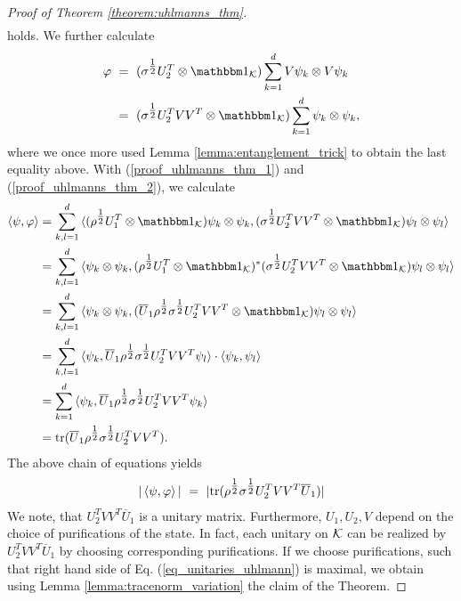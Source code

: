 \begin{proof}[Proof of Theorem \ref{theorem:uhlmanns_thm}]
\begin{align*}
    \end{align*}
    holds. We further calculate
    \begin{align}
     \varphi 
     &\ = \ (\sigma^{\tfrac{1}{2}}U_2^T \otimes \bbmeins_\cK)\sum_{k=1}^d V\psi_k \otimes V\psi_k \\
     &\ = \ (\sigma^{\tfrac{1}{2}}U_2^TVV^T \otimes \bbmeins_\cK)\sum_{k=1}^d \psi_k \otimes \psi_k, \label{proof_uhlmanns_thm_2}
    \end{align}
     where we once more used Lemma \ref{lemma:entanglement_trick} to obtain the last equality above. With (\ref{proof_uhlmanns_thm_1}) and (\ref{proof_uhlmanns_thm_2}), we calculate
     \begin{align*}
      \braket{\psi, \varphi} 
      & = \sum_{k,l=1}^d \braket{(\rho^{\tfrac{1}{2}}U_1^T \otimes \bbmeins_\cK)\psi_k \otimes \psi_k, (\sigma^{\tfrac{1}{2}}U_2^TVV^T \otimes \bbmeins_\cK) \psi_l \otimes \psi_l} \\
      & = \sum_{k,l=1}^d \braket{\psi_k \otimes \psi_k, (\rho^{\tfrac{1}{2}}U_1^T \otimes \bbmeins_\cK)^\ast (\sigma^{\tfrac{1}{2}}U_2^TVV^T \otimes \bbmeins_\cK) \psi_l \otimes \psi_l} \\
      & = \sum_{k,l=1}^d \braket{\psi_k \otimes \psi_k, (\overline{U}_1\rho^{\tfrac{1}{2}}\sigma^{\tfrac{1}{2}}U_2^TVV^T \otimes \bbmeins_\cK) \psi_l \otimes \psi_l} \\
      & = \sum_{k,l=1}^d \braket{\psi_k, \overline{U}_1\rho^{\tfrac{1}{2}}\sigma^{\tfrac{1}{2}}U_2^TVV^T \psi_l} \cdot \braket{\psi_k, \psi_l}\\
      & = \sum_{k=1}^d \braket{\psi_k, \overline{U}_1\rho^{\tfrac{1}{2}}\sigma^{\tfrac{1}{2}}U_2^TVV^T \psi_k} \\
      & = \tr(\overline{U}_1\rho^{\tfrac{1}{2}}\sigma^{\tfrac{1}{2}}U_2^TVV^T).
      \end{align*}
      The above chain of equations yields 
      \begin{align}
       |\braket{\psi, \varphi}| \ = \ |\tr(\rho^{\tfrac{1}{2}}\sigma^{\tfrac{1}{2}}U_2^TVV^T\overline{U}_1)| \label{eq_unitaries_uhlmann}
      \end{align}
      We note, that $U_2^TVV^T\overline{U}_1$ is a unitary matrix. Furthermore, $U_1, U_2, V$ depend on the choice of purifications of the state. In fact, each unitary on ${\mathcal K}$ can be realized by $U_2^TVV^T\overline{U}_1$ by choosing corresponding purifications. If we choose purifications, such that right hand side of Eq. (\ref{eq_unitaries_uhlmann}) is maximal, we obtain using  
      Lemma \ref{lemma:tracenorm_variation} the claim of the Theorem. 
 \end{proof}

